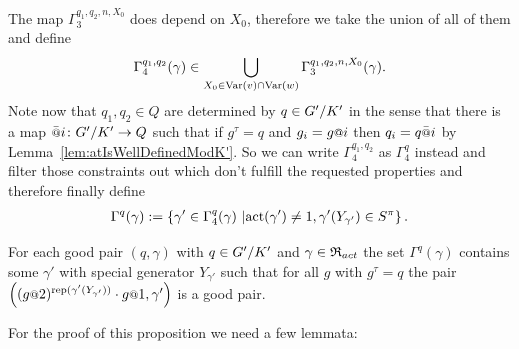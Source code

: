 \documentclass[a4paper,11pt]{amsart}
\begin{document}
 The map $\Gamma_3^{q_1,q_2,n,X_0}$ does depend on $X_0$, therefore we take the union of all of them and define
  \[\Gamma_4^{q_1,q_2}(\gamma)\in \bigcup_{X_0\in \textup{Var}(v)\cap\textup{Var}(w)}\Gamma_3^{q_1,q_2,n,X_0}(\gamma).\]
 Note now that $q_{1},q_2\in Q$ are determined by $q\in{G'/K'}$ in the sense that there is a map
 $\att{i}\colon \RNK{G'}{K'}\to Q$ such that if $g^\tau = q$ and $g_i=g\at{i}$ 
 then $q_i = q\att{i}$  by Lemma~\ref{lem:atIsWellDefinedModK'}. 
 So we can write $\Gamma_4^{q_1,q_2}$ as $\Gamma_4^q$ instead and filter 
 those constraints out which don't fulfill the requested properties and therefore finally define
 \begin{align}
 \Gamma^q(\gamma) := \left\{\gamma' \in \Gamma_4^q(\gamma) \ \middle \vert 
  \operatorname{act}(\gamma')\neq 1, \gamma'({Y_{\gamma'}}) \in S^\pi \right\}. 
  \label{def:Gammaq}
 \end{align}
 \begin{pro}\label{pro:existsNextPair}
 For each good pair $(q,\gamma)$ with $q\in{G'/K'}$ and $\gamma\in\mathfrak{R}_{act}$ the set $\Gamma^q(\gamma)$ 
 contains some $\gamma'$ with special generator $Y_{\gamma'}$ such that for all $g$ with $g^\tau=q$ the
 pair $\left((g\at{2})^{\textup{rep}(\gamma'(Y_{\gamma'}))}\cdot g\at{1},\gamma'\right)$ is a good pair.
\end{pro}
For the proof of this proposition we need a few lemmata:
%
%  
\end{document}
